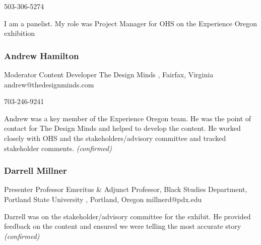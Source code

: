 \documentclass{report}
\begin{document}
              503-306-5274\newline

              I am a panelist. My role was Project Manager for OHS on the Experience Oregon exhibition\newline


              
                \subsubsection*{ Andrew Hamilton }
                Moderator\newline
                Content Developer \newline
                The Design Minds , Fairfax, Virginia 
                \newline
                andrew@thedesignminds.com\newline
                
                703-246-9241\newline

                Andrew was a key member of the Experience Oregon team. He was the point of contact for The Design Minds and helped to develop the content. He worked closely with OHS and the stakeholders/advisory committee and tracked stakeholder comments.\newline
                \emph{ (confirmed) }
              

              
                \subsubsection*{ Darrell Millner  }
                Presenter\newline
                Professor Emeritus \& Adjunct Professor, Black Studies Department,\newline
                Portland State University , Portland, Oregon 
                \newline
                millnerd@pdx.edu\newline
                
                

                Darrell was on the stakeholder/advisory committee for the exhibit. He provided feedback on the content and ensured we were telling the most accurate story
                \emph{ (confirmed) }
              
\end{document}
